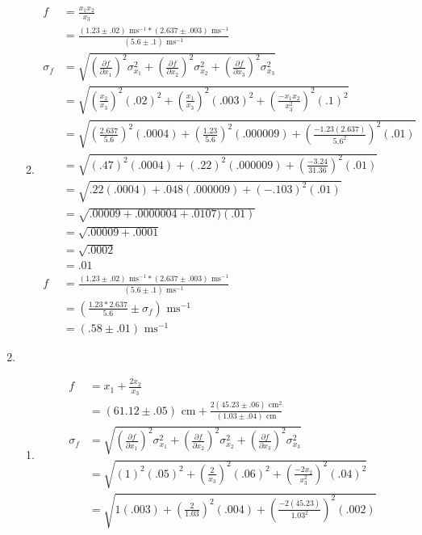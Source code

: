 \documentclass{article}
\begin{document}
\begin{enumerate}
\begin{enumerate}
\begin{align*}
\end{align*}
\item
\begin{align*}
f &= \frac{x_{1}x_{2}}{x_{3}}\\
&= \frac{(1.23 \pm .02)\text{ ms}^{-1} * (2.637 \pm .003)\text{ ms}^{-1}}{(5.6 \pm .1)\text{ ms}^{-1}}\\
\sigma_{f} &= \sqrt{(\frac{\partial f}{\partial x_{1}})^2\sigma_{x_{1}}^2 + (\frac{\partial f}{\partial x_{2}})^2\sigma_{x_{2}}^2 + (\frac{\partial f}{\partial x_{3}})^2\sigma_{x_{3}}^2}\\
&= \sqrt{(\frac{x_{2}}{x_{3}})^2(.02)^2 + (\frac{x_{1}}{x_{3}})^2(.003)^2 + (\frac{-x_{1}x_{2}}{x_{3}^2})^2(.1)^2}\\
&= \sqrt{(\frac{2.637}{5.6})^2(.0004) + (\frac{1.23}{5.6})^2(.000009) + (\frac{-1.23(2.637)}{5.6^2})^2(.01)}\\
&= \sqrt{(.47)^2(.0004) + (.22)^2(.000009) + (\frac{-3.24}{31.36})^2(.01)}\\
&= \sqrt{.22(.0004) + .048(.000009) + (-.103)^2(.01)}\\
&= \sqrt{.00009 + .0000004 + .0107)(.01)}\\
&= \sqrt{.00009 + .0001}\\
&= \sqrt{.0002}\\
&= .01\\
f &= \frac{(1.23 \pm .02)\text{ ms}^{-1} * (2.637 \pm .003)\text{ ms}^{-1}}{(5.6 \pm .1)\text{ ms}^{-1}}\\
&= (\frac{1.23 * 2.637}{5.6} \pm \sigma_{f})\text{ ms}^{-1}\\
&= (.58 \pm .01)\text{ ms}^{-1}
\end{align*}
\end{enumerate}
\item
\begin{enumerate}
\item
\begin{align*}
f &= x_{1} + \frac{2x_{2}}{x_{3}}\\
&= (61.12 \pm .05)\text{ cm} + \frac{2(45.23 \pm .06)\text{ cm}^2}{(1.03 \pm .04)\text{ cm}}\\
\sigma_{f} &= \sqrt{(\frac{\partial f}{\partial x_{1}})^2\sigma_{x_{1}}^2 + (\frac{\partial f}{\partial x_{2}})^2\sigma_{x_{2}}^2 + (\frac{\partial f}{\partial x_{3}})^2\sigma_{x_{3}}^2}\\
&= \sqrt{(1)^2(.05)^2 + (\frac{2}{x_{3}})^2(.06)^2 + (\frac{-2x_{2}}{x_{3}^2})^2(.04)^2}\\
&= \sqrt{1(.003) + (\frac{2}{1.03})^2(.004) + (\frac{-2(45.23)}{1.03^2})^2(.002)}\\

\end{align*}
\end{enumerate}
\end{enumerate}
\end{document}
